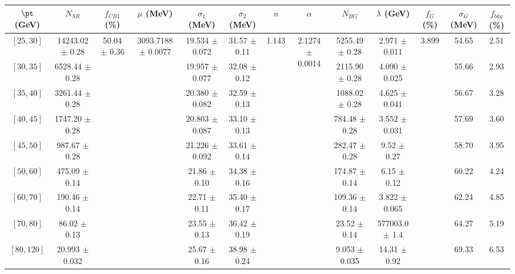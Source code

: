 \begin{tabular}{c||c|c|c|c|c|c|c|c|c|c|c||c}
$\pt$ (GeV) & $N_{SR}$ & $f_{CB1}$ (\%) & $\mu$ (MeV) & $\sigma_1$ (MeV) & $\sigma_2$ (MeV) & $n$ & $\alpha$ & $N_{BG}$ & $\lambda$ (GeV) & $f_G$ (\%) & $\sigma_G$ (MeV) & $f_{bkg}$ (\%) \\
\hline
$[25, 30]$ & 14243.02 $\pm$ 0.28 & \multirow{9}{*}{50.04 $\pm$ 0.36} & \multirow{9}{*}{3093.7188 $\pm$ 0.0077} & 19.534 $\pm$ 0.072 & 31.57 $\pm$ 0.11 & \multirow{9}{*}{1.143} & \multirow{9}{*}{2.1274 $\pm$ 0.0014} & 5255.49 $\pm$ 0.28 & 2.971 $\pm$ 0.011 & \multirow{9}{*}{3.899} & 54.65 & 2.51\\
$[30, 35]$ & 6528.44 $\pm$ 0.28 &  &  & 19.957 $\pm$ 0.077 & 32.08 $\pm$ 0.12 &  &  & 2115.90 $\pm$ 0.28 & 4.090 $\pm$ 0.025 &  & 55.66 & 2.93\\
$[35, 40]$ & 3261.44 $\pm$ 0.28 &  &  & 20.380 $\pm$ 0.082 & 32.59 $\pm$ 0.13 &  &  & 1088.02 $\pm$ 0.28 & 4.625 $\pm$ 0.041 &  & 56.67 & 3.28\\
$[40, 45]$ & 1747.20 $\pm$ 0.28 &  &  & 20.803 $\pm$ 0.087 & 33.10 $\pm$ 0.13 &  &  & 784.48 $\pm$ 0.28 & 3.552 $\pm$ 0.031 &  & 57.69 & 3.60\\
$[45, 50]$ & 987.67 $\pm$ 0.28 &  &  & 21.226 $\pm$ 0.092 & 33.61 $\pm$ 0.14 &  &  & 282.47 $\pm$ 0.28 & 9.52 $\pm$ 0.27 &  & 58.70 & 3.95\\
$[50, 60]$ & 475.09 $\pm$ 0.14 &  &  & 21.86 $\pm$ 0.10 & 34.38 $\pm$ 0.16 &  &  & 174.87 $\pm$ 0.14 & 6.15 $\pm$ 0.12 &  & 60.22 & 4.24\\
$[60, 70]$ & 190.46 $\pm$ 0.14 &  &  & 22.71 $\pm$ 0.11 & 35.40 $\pm$ 0.17 &  &  & 109.36 $\pm$ 0.14 & 3.822 $\pm$ 0.065 &  & 62.24 & 4.85\\
$[70, 80]$ & 86.02 $\pm$ 0.13 &  &  & 23.55 $\pm$ 0.13 & 36.42 $\pm$ 0.19 &  &  & 23.52 $\pm$ 0.14 & 577003.0 $\pm$ 1.4 &  & 64.27 & 5.19\\
$[80, 120]$ & 20.993 $\pm$ 0.032 &  &  & 25.67 $\pm$ 0.16 & 38.98 $\pm$ 0.24 &  &  & 9.053 $\pm$ 0.035 & 14.31 $\pm$ 0.92 &  & 69.33 & 6.53\\
\end{tabular}
